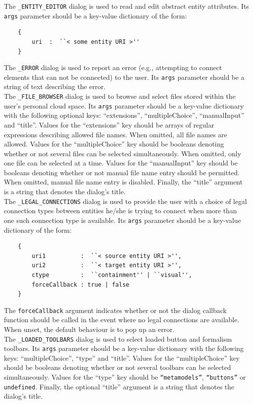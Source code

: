 \documentclass{article}
\numberwithin{equation}{section}
\numberwithin{figure}{section}
\begin{document}
The \texttt{\_ENTITY\_EDITOR} dialog is used to read and edit abstract entity attributes. Its \texttt{args} parameter should be a key-value dictionary of the form:
\begin{verbatim}
    {
        uri  :  ``< some entity URI >''
    }
\end{verbatim}

The \texttt{\_ERROR} dialog is used to report an error (e.g., attempting to connect elements that can not be connected) to the user. Its \texttt{args} parameter should be a string of text describing the error.\\

The \texttt{\_FILE\_BROWSER} dialog is used to browse and select files stored within the user's personal cloud space. Its \texttt{args} parameter should be a key-value dictionary with the following optional keys: ``extensions'', ``multipleChoice'', ``manualInput'' and ``title''. Values for the ``extensions'' key should be arrays of regular expressions describing allowed file names. When omitted, all file names are allowed. Values for the ``multipleChoice'' key should be booleans denoting whether or not several files can be selected simultaneously. When omitted, only one file can be selected at a time. Values for the ``manualInput'' key should be booleans denoting  whether or not manual file name entry should be permitted. When omitted, manual file name entry is disabled. Finally, the ``title'' argument is a string that denotes the dialog's title.\\

The \texttt{\_LEGAL\_CONNECTIONS} dialog is used to provide the user with a choice of legal connection types between entities he/she is trying to connect when more than one such connection type is available. Its \texttt{args} parameter should be a key-value dictionary of the form:
\begin{verbatim}
    {
        uri1          :  ``< source entity URI >'', 
        uri2          :  ``< target entity URI >'', 
        ctype         :  ``containment'' | ``visual'',
        forceCallback : true | false
    }
\end{verbatim}
The \texttt{forceCallback} argument indicates whether or not the dialog callback function should be called in the event where no legal connections are available. When unset, the default behaviour is to pop up an error.\\

The \texttt{\_LOADED\_TOOLBARS} dialog is used to select loaded button and formalism toolbars. Its \texttt{args} parameter should be a key-value dictionary with the following keys: ``multipleChoice'', ``type'' and ``title''. Values for the ``multipleChoice'' key should be booleans denoting whether or not several toolbars can be selected simultaneously. Values for the ``type'' key should be \texttt{``metamodels''}, \texttt{``buttons''} or \texttt{undefined}. Finally, the optional ``title'' argument is a string that denotes the dialog's title.\\
\end{document}
